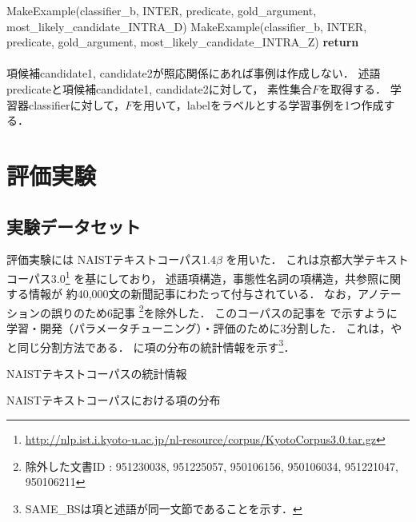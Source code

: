 \documentclass[japanese]{jnlp_1.4}
\newcommand{\tblref}[1]{}
\newcommand{\newcite}[1]{}
\begin{document}
\begin{algorithm}[p]
\begin{algorithmic}
	\State MakeExample(classifier\_b, INTER, predicate, gold\_argument, most\_likely\_candidate\_INTRA\_D)
	\State MakeExample(classifier\_b, INTER, predicate, gold\_argument, most\_likely\_candidate\_INTRA\_Z)
\EndIf
\State \textbf{return}
\EndProcedure
\\
 \\
\State 項候補candidate1, candidate2が照応関係にあれば事例は作成しない．
\State 述語predicateと項候補candidate1, candidate2に対して，
	素性集合$F$を取得する．
\State 学習器classifierに対して，$F$を用いて，labelをラベルとする学習事例を1つ作成する．
\EndProcedure
\end{algorithmic}
\end{algorithm}


\section{評価実験} \label{experiment}

\subsection{実験データセット}

評価実験には
NAISTテキストコーパス1.4$\beta$ \cite{Iida:2010:JNLP}を用いた．
これは京都大学テキストコーパス3.0\footnote{\url{http://nlp.ist.i.kyoto-u.ac.jp/nl-resource/corpus/KyotoCorpus3.0.tar.gz}}
を基にしており，
述語項構造，事態性名詞の項構造，共参照に関する情報が
約40,000文の新聞記事にわたって付与されている．
なお，アノテーションの誤りのため6記事
\footnote{除外した文書ID :
951230038, 951225057, 950106156, 950106034, 951221047, 950106211
}を除外した．
このコーパスの記事を
\tblref{tbl:corpus-statics}で示すように
学習・開発（パラメータチューニング）・評価のために3分割した．
これは，\newcite{Taira:2008:EMNLP}や\newcite{Yoshikawa:2013:JNLP}と同じ分割方法である．
\tblref{tbl:corpus-arg-dist}に項の分布の統計情報を示す\footnote{SAME\_BSは項と述語が同一文節であることを示す．}．

\begin{table}[b]
\caption{NAISTテキストコーパスの統計情報}
\label{tbl:corpus-statics}

\end{table}
\begin{table}[b]
\caption{NAISTテキストコーパスにおける項の分布}
\label{tbl:corpus-arg-dist}

\end{table}
\end{document}
